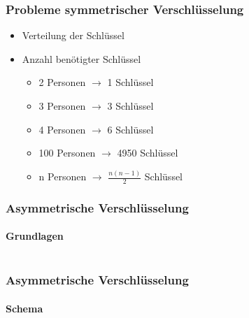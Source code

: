 \begin{frame}
  \frametitle{Probleme symmetrischer Verschlüsselung}
  \begin{itemize}
    \item Verteilung der Schlüssel
    \item Anzahl benötigter Schlüssel
    \begin{itemize}
      \item 2 Personen $\rightarrow$ 1 Schlüssel
      \item 3 Personen $\rightarrow$ 3 Schlüssel
      \pause
      \item 4 Personen $\rightarrow$ 6 Schlüssel
      \item 100 Personen $\rightarrow$ 4950 Schlüssel
      \item n Personen $\rightarrow$ $\frac{n(n-1)}{2}$ Schlüssel
    \end{itemize}
  \end{itemize}
\end{frame}

\begin{frame}
  \frametitle{Asymmetrische Verschlüsselung}
  \framesubtitle{Grundlagen}
  \begin{columns}[c]
    \begin{column}{0.5\textwidth}
      \center {}
    \end{column}
    \begin{column}{0.5\textwidth}
      \center {}
    \end{column}
  \end{columns}
\end{frame}

\begin{frame}
  \frametitle{Asymmetrische Verschlüsselung}
  \framesubtitle{Schema}
  \center {}
\end{frame}

